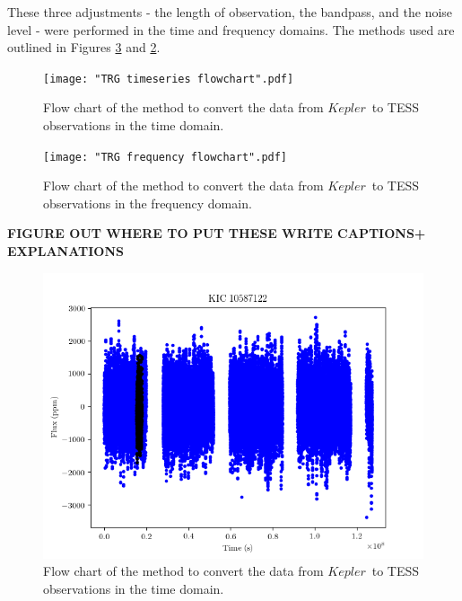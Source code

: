 \documentclass[a4paper,fleqn,usenatbib,useAMS]{mnras}
\newcommand{\kep}{\ensuremath{Kepler}}
\begin{document}
These three adjustments - the length of observation, the bandpass, and the noise level - were performed in the time and frequency domains. The methods used are outlined in Figures \ref{ts flowchart} and \ref{fr flowchart}.

\onecolumn
\begin{figure}
	\centering
	\texttt{[image: "TRG timeseries flowchart".pdf]}
	\caption{Flow chart of the method to convert the data from \kep \ to TESS observations in the time domain.}	
	\label{ts flowchart}
\end{figure} 

\begin{figure}
	\centering
	\texttt{[image: "TRG frequency flowchart".pdf]}
	\caption{Flow chart of the method to convert the data from \kep \ to TESS observations in the frequency domain.}	
	\label{fr flowchart}
\end{figure}
\newpage
\twocolumn





\bf{FIGURE OUT WHERE TO PUT THESE WRITE CAPTIONS+ EXPLANATIONS}

\begin{figure}
	\centering
	\includegraphics[scale=0.6]{timeseries_10587122}
	\caption{Flow chart of the method to convert the data from \kep \ to TESS observations in the time domain.}	
	\label{ts flowchart}
\end{figure} 
\end{document}
